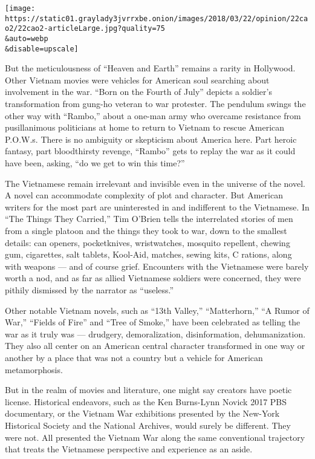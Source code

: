 \texttt{[image: https://static01.graylady3jvrrxbe.onion/images/2018/03/22/opinion/22cao2/22cao2-articleLarge.jpg?quality=75\\\&auto=webp\\\&disable=upscale]}

But the meticulousness of ``Heaven and Earth'' remains a rarity in
Hollywood. Other Vietnam movies were vehicles for American soul
searching about involvement in the war. ``Born on the Fourth of July''
depicts a soldier's transformation from gung-ho veteran to war
protester. The pendulum swings the other way with ``Rambo,'' about a
one-man army who overcame resistance from pusillanimous politicians at
home to return to Vietnam to rescue American P.O.W.s. There is no
ambiguity or skepticism about America here. Part heroic fantasy, part
bloodthirsty revenge, ``Rambo'' gets to replay the war as it could have
been, asking, ``do we get to win this time?''

The Vietnamese remain irrelevant and invisible even in the universe of
the novel. A novel can accommodate complexity of plot and character. But
American writers for the most part are uninterested in and indifferent
to the Vietnamese. In ``The Things They Carried,'' Tim O'Brien tells the
interrelated stories of men from a single platoon and the things they
took to war, down to the smallest details: can openers, pocketknives,
wristwatches, mosquito repellent, chewing gum, cigarettes, salt tablets,
Kool-Aid, matches, sewing kits, C rations, along with weapons --- and of
course grief. Encounters with the Vietnamese were barely worth a nod,
and as far as allied Vietnamese soldiers were concerned, they were
pithily dismissed by the narrator as ``useless.''

Other notable Vietnam novels, such as ``13th Valley,'' ``Matterhorn,''
``A Rumor of War,'' ``Fields of Fire'' and ``Tree of Smoke,'' have been
celebrated as telling the war as it truly was --- drudgery,
demoralization, disinformation, dehumanization. They also all center on
an American central character transformed in one way or another by a
place that was not a country but a vehicle for American metamorphosis.

But in the realm of movies and literature, one might say creators have
poetic license. Historical endeavors, such as the Ken Burns-Lynn Novick
2017 PBS documentary, or the Vietnam War exhibitions presented by the
New-York Historical Society and the National Archives, would surely be
different. They were not. All presented the Vietnam War along the same
conventional trajectory that treats the Vietnamese perspective and
experience as an aside.


